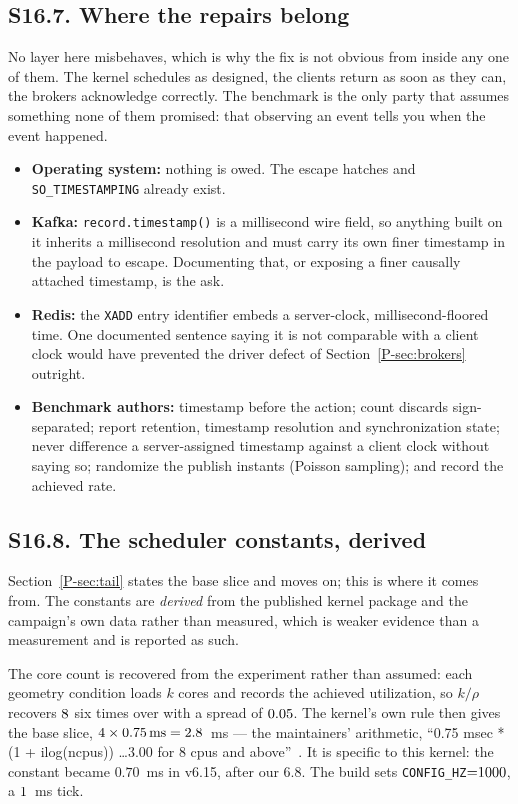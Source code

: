 \documentclass[10pt,journal,onecolumn]{IEEEtran}
\newcommand{\kafka}{Kafka}
\newcommand{\redis}{Redis}
\newcommand{\mainSpectrum}{\ref{P-sec:tail}}        %
\newcommand{\mainBrokers}{\ref{P-sec:brokers}}        %
\begin{document}
\subsection{S16.7. Where the repairs belong}

No layer here misbehaves, which is why the fix is not obvious from inside any one of them.
The kernel schedules as designed, the clients return as soon as they can, the brokers
acknowledge correctly. The benchmark is the only party that assumes something none of them
promised: that observing an event tells you when the event happened.

\begin{itemize}
\item \textbf{Operating system:} nothing is owed. The escape hatches and
\texttt{SO\_TIMESTAMPING} already exist.
\item \textbf{\kafka{}:} \texttt{record.timestamp()} is a millisecond wire field, so anything
built on it inherits a millisecond resolution and must carry its own finer timestamp in the payload
to escape. Documenting that, or exposing a finer causally attached timestamp, is the ask.
\item \textbf{\redis{}:} the \texttt{XADD} entry identifier embeds a server-clock,
millisecond-floored time. One documented sentence saying it is not comparable with a client
clock would have prevented the driver defect of Section~\mainBrokers{} outright.
\item \textbf{Benchmark authors:} timestamp before the action; count discards sign-separated;
report retention, timestamp resolution and synchronization state; never difference a
server-assigned timestamp against a client clock without saying so; randomize the publish instants
(Poisson sampling); and record the achieved rate.
\end{itemize}



\subsection{S16.8. The scheduler constants, derived}
\label{sec:slice-derivation}

Section~\mainSpectrum{} states the base slice and moves on; this is where it comes from. The constants
are \emph{derived} from the published kernel package and the campaign's own data rather than
measured, which is weaker evidence than a measurement and is reported as such.

The core count is recovered from the experiment rather than assumed: each geometry condition
loads $k$ cores and records the achieved utilization, so $k/\rho$ recovers $8$ six
times over with a spread of $0.05$. The kernel's own rule then gives the base
slice, $4 \times 0.75\,\mathrm{ms} = 2.8$~ms --- the maintainers'
arithmetic, ``0.75 msec * (1 + ilog(ncpus)) \ldots 3.00 for 8 cpus and
above''~\cite{zhou2025slice}. It is specific to this kernel: the constant became $0.70$~ms in
v6.15, after our 6.8. The build sets \texttt{CONFIG\_HZ}${=}1000$, a $1$~ms tick.
\end{document}
